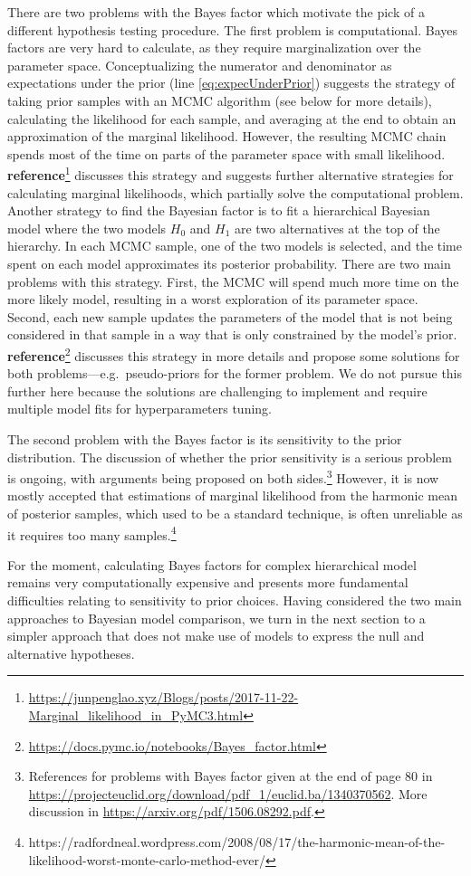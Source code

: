\documentclass[a4paper,12pt,twoside]{article}
\begin{document}
There are two problems with the Bayes factor which motivate the pick of a different hypothesis testing procedure. The first problem is computational. Bayes factors are very hard to calculate, as they require marginalization over the parameter space. Conceptualizing the numerator and denominator as expectations under the prior (line \ref{eq:expecUnderPrior}) suggests the strategy of taking prior samples with an MCMC algorithm (see below for more details), calculating the likelihood for each sample, and averaging at the end to obtain an approximation of the marginal likelihood. However, the resulting MCMC chain spends most of the time on parts of the parameter space with small likelihood. \textbf{reference}\footnote{\url{https://junpenglao.xyz/Blogs/posts/2017-11-22-Marginal_likelihood_in_PyMC3.html}} discusses this strategy and suggests further alternative strategies for calculating marginal likelihoods, which partially solve the computational problem.  Another strategy to find the Bayesian factor is to fit a hierarchical Bayesian model where the two models $H_0$ and $H_1$ are two alternatives at the top of the hierarchy. In each MCMC sample, one of the two models is selected, and the time spent on each model approximates its posterior probability. There are two main problems with this strategy. First, the MCMC will spend much more time on the more likely model, resulting in a worst exploration of its parameter space. Second, each new sample updates the parameters of the model that is not being considered in that sample in a way that is only constrained by the model's prior. \textbf{reference}\footnote{\url{https://docs.pymc.io/notebooks/Bayes_factor.html}} discusses this strategy in more details and propose some solutions for both problems---e.g.\ pseudo-priors for the former problem. We do not pursue this further here because the solutions are challenging to implement and require multiple model fits for hyperparameters tuning. 

The second problem with the Bayes factor is its sensitivity to the prior distribution. The discussion of whether the prior sensitivity is a serious problem is ongoing, with arguments being proposed on both sides.\footnote{References for problems with Bayes factor given at the end of page 80 in \url{https://projecteuclid.org/download/pdf_1/euclid.ba/1340370562}. More discussion in \url{https://arxiv.org/pdf/1506.08292.pdf}.} However, it is now mostly accepted that estimations of marginal likelihood from the harmonic mean of posterior samples, which used to be a standard technique, is often unreliable as it requires too many samples.\footnote{https://radfordneal.wordpress.com/2008/08/17/the-harmonic-mean-of-the-likelihood-worst-monte-carlo-method-ever/} 

For the moment, calculating Bayes factors for complex hierarchical model remains very computationally expensive and presents more fundamental difficulties relating to sensitivity to prior choices. Having considered the two main approaches to Bayesian model comparison, we turn in the next section to a simpler approach that does not make use of models to express the null and alternative hypotheses.
\end{document}
